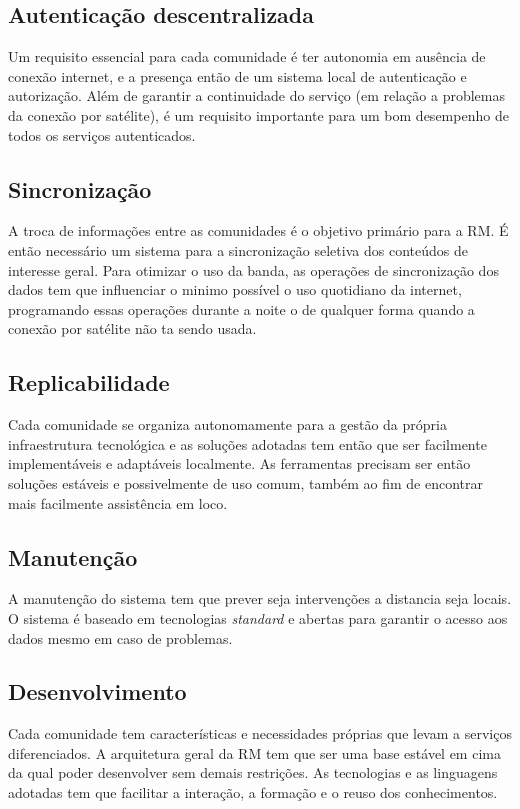 \subsection{Autenticação descentralizada}
\label{sec:AutDec}
Um requisito essencial para cada comunidade é ter autonomia em
ausência de conexão internet, e a presença então de um sistema local
de autenticação e autorização. Além de garantir a continuidade do
serviço (em relação a problemas da conexão por satélite), é um
requisito importante para um bom desempenho de todos os serviços autenticados. 

\subsection{Sincronização}\label{Sincronizazzione}
A troca de informações entre as comunidades é o objetivo primário para
a RM. É então necessário um sistema para a sincronização seletiva dos
conteúdos de interesse geral. Para otimizar o uso da banda, as
operações de sincronização dos dados tem que influenciar o minimo
possível o uso quotidiano da internet, programando essas operações
durante a noite o de qualquer forma quando a conexão por satélite não
ta sendo usada. 

\subsection{Replicabilidade}
Cada comunidade se organiza autonomamente para a gestão da própria
infraestrutura tecnológica e as soluções adotadas tem então que ser
facilmente implementáveis e adaptáveis localmente. As ferramentas
precisam ser então soluções estáveis e possivelmente de uso comum,
também ao fim de encontrar mais facilmente assistência em loco. 

\subsection{Manutenção}
A manutenção do sistema tem que prever seja intervenções a distancia
seja locais. O sistema é baseado em tecnologias \emph{standard} e
abertas para garantir o acesso aos dados mesmo em caso de problemas.

\subsection{Desenvolvimento}
Cada comunidade tem características e necessidades próprias que levam
a serviços diferenciados. A arquitetura geral da RM tem que ser uma
base estável em cima da qual poder desenvolver sem demais restrições.
As tecnologias e as linguagens adotadas tem que facilitar a interação,
a formação e o reuso dos conhecimentos. 


